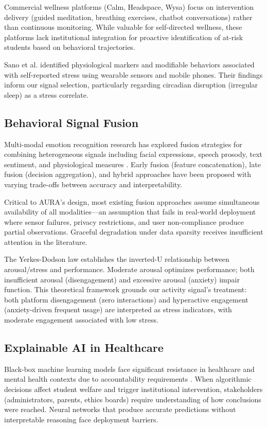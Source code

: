 \documentclass[journal]{IEEEtran}
\begin{document}
Commercial wellness platforms (Calm, Headspace, Wysa) focus on intervention delivery (guided meditation, breathing exercises, chatbot conversations) rather than continuous monitoring. While valuable for self-directed wellness, these platforms lack institutional integration for proactive identification of at-risk students based on behavioral trajectories.

Sano et al. \cite{sano2018} identified physiological markers and modifiable behaviors associated with self-reported stress using wearable sensors and mobile phones. Their findings inform our signal selection, particularly regarding circadian disruption (irregular sleep) as a stress correlate.

\subsection{Behavioral Signal Fusion}

Multi-modal emotion recognition research has explored fusion strategies for combining heterogeneous signals including facial expressions, speech prosody, text sentiment, and physiological measures \cite{poria2017}. Early fusion (feature concatenation), late fusion (decision aggregation), and hybrid approaches have been proposed with varying trade-offs between accuracy and interpretability.

Critical to AURA's design, most existing fusion approaches assume simultaneous availability of all modalities—an assumption that fails in real-world deployment where sensor failures, privacy restrictions, and user non-compliance produce partial observations. Graceful degradation under data sparsity receives insufficient attention in the literature.

The Yerkes-Dodson law \cite{yerkes1908} establishes the inverted-U relationship between arousal/stress and performance. Moderate arousal optimizes performance; both insufficient arousal (disengagement) and excessive arousal (anxiety) impair function. This theoretical framework grounds our activity signal's treatment: both platform disengagement (zero interactions) and hyperactive engagement (anxiety-driven frequent usage) are interpreted as stress indicators, with moderate engagement associated with low stress.

\subsection{Explainable AI in Healthcare}

Black-box machine learning models face significant resistance in healthcare and mental health contexts due to accountability requirements \cite{holzinger2017}. When algorithmic decisions affect student welfare and trigger institutional intervention, stakeholders (administrators, parents, ethics boards) require understanding of how conclusions were reached. Neural networks that produce accurate predictions without interpretable reasoning face deployment barriers.
\end{document}
